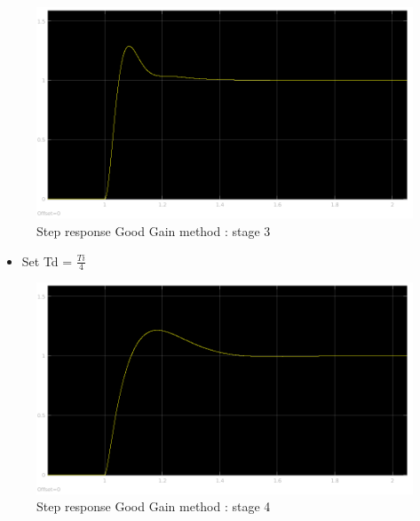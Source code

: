   \begin{figure}[H]
    \centering
    \includegraphics[scale=0.4]{figures/GoodGain_step3.png}
    \caption[LABEL] {Step response Good Gain method : stage 3} 
  \end{figure}
    
    
\begin{itemize}
  \item Set Td = $\frac{Ti}{4}$
\end{itemize}
  
  \begin{figure}[H]
    \centering
    \includegraphics[scale=0.4]{figures/GoodGain_step4.png}
    \caption[LABEL] {Step response Good Gain method : stage 4} 
  \end{figure}